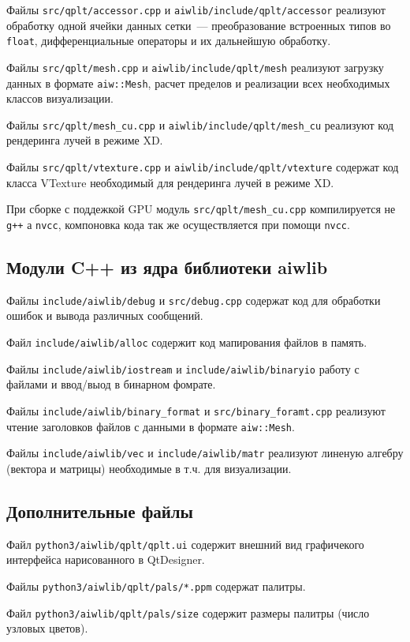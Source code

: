 \documentclass[12pt]{article}
\begin{document}
Файлы \verb'src/qplt/accessor.cpp' и \verb'aiwlib/include/qplt/accessor' реализуют обработку одной ячейки данных сетки~--- преобразование
встроенных типов во \verb'float', дифференциальные операторы и их дальнейшую обработку. 

Файлы \verb'src/qplt/mesh.cpp' и \verb'aiwlib/include/qplt/mesh' реализуют загрузку данных в формате \verb'aiw::Mesh',
расчет пределов и реализации всех необходимых классов визуализации. 

Файлы \verb'src/qplt/mesh_cu.cpp' и \verb'aiwlib/include/qplt/mesh_cu' реализуют код рендеринга лучей в режиме XD.

Файлы \verb'src/qplt/vtexture.cpp' и \verb'aiwlib/include/qplt/vtexture' содержат код класса VTexture необходимый для рендеринга лучей в режиме XD.

При сборке с поддежкой GPU модуль   \verb'src/qplt/mesh_cu.cpp' компилируется не \verb'g++' а \verb'nvcc', компоновка кода так же осуществляется
при помощи \verb'nvcc'. 

\subsection{Модули C++ из ядра библиотеки aiwlib}
Файлы \verb'include/aiwlib/debug' и \verb'src/debug.cpp' содержат код для обработки ошибок и вывода различных сообщений.

Файл \verb'include/aiwlib/alloc' содержит код мапирования файлов в память.

Файлы \verb'include/aiwlib/iostream' и \verb'include/aiwlib/binaryio' работу с файлами и ввод/выод в бинарном фомрате.

Файлы \verb'include/aiwlib/binary_format' и \verb'src/binary_foramt.cpp' реализуют чтение заголовков файлов с данными в формате \verb'aiw::Mesh'.

Файлы \verb'include/aiwlib/vec' и \verb'include/aiwlib/matr' реализуют линеную алгебру (вектора и матрицы) необходимые в т.ч. для визуализации.


\subsection{Дополнительные файлы}
Файл \verb'python3/aiwlib/qplt/qplt.ui' содержит внешний вид графичекого интерфейса нарисованного в QtDesigner.

Файлы \verb'python3/aiwlib/qplt/pals/*.ppm' содержат палитры.

Файл \verb'python3/aiwlib/qplt/pals/size' содержит размеры палитры (число узловых цветов).
\end{document}
